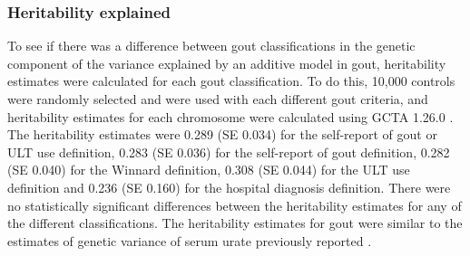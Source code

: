\documentclass[]{report}
\begin{document}
\subsubsection{Heritability explained}\label{heritability-explained}

To see if there was a difference between gout classifications in the
genetic component of the variance explained by an additive model in
gout, heritability estimates were calculated for each gout
classification. To do this, 10,000 controls were randomly selected and
were used with each different gout criteria, and heritability estimates
for each chromosome were calculated using GCTA 1.26.0
\citep{Yang2011part}. The heritability estimates were 0.289 (SE 0.034)
for the self-report of gout or ULT use definition, 0.283 (SE 0.036) for
the self-report of gout definition, 0.282 (SE 0.040) for the Winnard
definition, 0.308 (SE 0.044) for the ULT use definition and 0.236 (SE
0.160) for the hospital diagnosis definition. There were no
statistically significant differences between the heritability estimates
for any of the different classifications. The heritability estimates for
gout were similar to the estimates of genetic variance of serum urate
previously reported \citep{Kottgen2013}.
\end{document}
